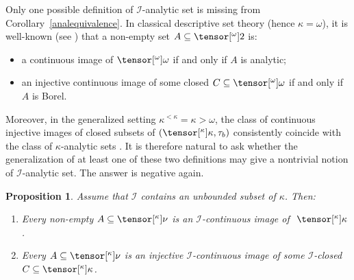 \documentclass{amsart}
\numberwithin{equation}{section}
\newcommand{\I}{\mathcal{I}}
\newcommand{\pre}[2]{\tensor[^{#1}]{#2}{}}
\newcommand{\1}{\mathbf{I}}
\newcommand{\2}{\mathbf{II}}
\renewcommand{\k}{\kappa}
\renewcommand{\o}{\omega}
\newtheorem{proposition}[theorem]{Proposition}
\theoremstyle{definition}
\theoremstyle{remark}
\begin{document}
Only one possible definition of \(\I\)-analytic set is missing from Corollary~\ref{analequivalence}.
In classical descriptive set theory (hence \(\k=\o\)), it is well-known (see \cite[Section 14-15]{Kech}) that a non-empty set \(A \subseteq \pre{\o}{2}\) is:
\begin{itemize}
    \item a continuous image of \(\pre{\o}{\o}\) if and only if \(A\) is analytic;
    \item an injective continuous image of some closed \(C \subseteq \pre{\o}{\o}\) if and only if \(A\) is Borel. 
\end{itemize}

Moreover, in the generalized setting \(\k^{<\k}=\k>\o\), the class of  continuous injective images of closed subsets of \((\pre{\k}{\k}, \tau_b)\) consistently coincide with the class of \(\k\)-analytic sets \cite{LS15}.
It is therefore natural to ask whether the generalization of at least one of these two definitions may give a nontrivial notion of \(\I\)-analytic set. The answer is negative again.  

\begin{proposition} \label{prop_wrong_anal}
Assume that \(\I\) contains an unbounded subset of \(\k\). Then:
	\begin{enumerate}[label={\upshape (\arabic*)}, leftmargin=2pc]
		\item\label{prop_wrong_anal1} Every non-empty \(A \subseteq \pre{\k}{\nu}\) is an \(\I\)-continuous image of \(\ \pre{\k}{\k} \).
		\item\label{prop_wrong_anal2} Every \(A \subseteq \pre{\k}{\nu}\) is an injective \(\I\)-continuous image of some \(\I\)-closed \(C \subseteq \pre{\k}{\k}\).
	\end{enumerate}
\end{proposition}
\end{document}
